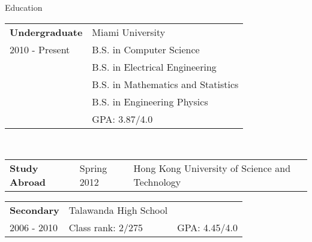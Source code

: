 \documentclass{resume} %
\begin{document}
\begin{rSection}{Education}
  \begin{tabular}{ll}
    \textbf{Undergraduate}    & Miami University \\
    2010 - Present   & B.S. in Computer Science \\
    & B.S. in Electrical Engineering \\
    & B.S. in Mathematics and Statistics \\
    & B.S. in Engineering Physics \\
    & GPA: 3.87/4.0 \\
  \end{tabular} \\
  \begin{tabular}{lll}
    \textbf{Study Abroad} & Spring 2012 &  Hong Kong University of Science and Technology   \\
  \end{tabular}

  \begin{tabular}{lll}
    \textbf{Secondary}    & Talawanda High School \\
    2006 - 2010           & Class rank: 2/275 & GPA: 4.45/4.0 \\
  \end{tabular} 
\end{rSection}
\end{document}
